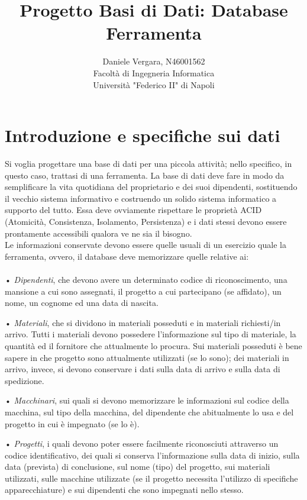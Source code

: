 \documentclass[a4paper,12pt,italian]{article}
\title{Progetto Basi di Dati: Database Ferramenta}
\author{Daniele Vergara, N46001562 \\ Facoltà di Ingegneria Informatica\\ Università "Federico II" di Napoli}
\date{}
\begin{document}
\maketitle

\tableofcontents
\section*{Introduzione e specifiche sui dati}

Si voglia progettare una base di dati per una piccola attività; nello specifico, in questo caso, trattasi di una ferramenta. La base di dati deve fare in modo da semplificare la vita quotidiana del proprietario e dei suoi dipendenti, sostituendo il vecchio sistema informativo e costruendo un solido sistema informatico a supporto del tutto. 
Essa deve ovviamente rispettare le proprietà ACID (Atomicità, Consistenza, Isolamento, Persistenza) e i dati stessi devono essere prontamente accessibili qualora ve ne sia il bisogno.\\ Le informazioni conservate devono essere quelle usuali di un esercizio quale la ferramenta, ovvero, il database deve memorizzare quelle relative ai: \\ \\

• \emph{Dipendenti}, che devono avere un determinato codice di riconoscimento, una mansione a cui sono assegnati, il progetto a cui partecipano (se affidato), un nome, un cognome ed una data di nascita.

• \emph{Materiali}, che si dividono in materiali posseduti e in materiali richiesti/in arrivo. Tutti i materiali devono possedere l'informazione sul tipo di materiale, la quantità ed il fornitore che attualmente lo procura. Sui materiali posseduti è bene sapere in che progetto sono attualmente utilizzati (se lo sono); dei materiali in arrivo, invece, si devono conservare i dati sulla data di arrivo e sulla data di spedizione.

• \emph{Macchinari}, sui quali si devono memorizzare le informazioni sul codice della macchina, sul tipo della macchina, del dipendente che abitualmente lo usa e del progetto in cui è impegnato (se lo è).

• \emph{Progetti}, i quali devono poter essere facilmente riconosciuti attraverso un codice identificativo, dei quali si conserva l'informazione sulla data di inizio, sulla data (prevista) di conclusione, sul nome (tipo) del progetto, sui materiali utilizzati, sulle macchine utilizzate (se il progetto necessita l'utilizzo di specifiche apparecchiature) e sui dipendenti che sono impegnati nello stesso.
\end{document}
